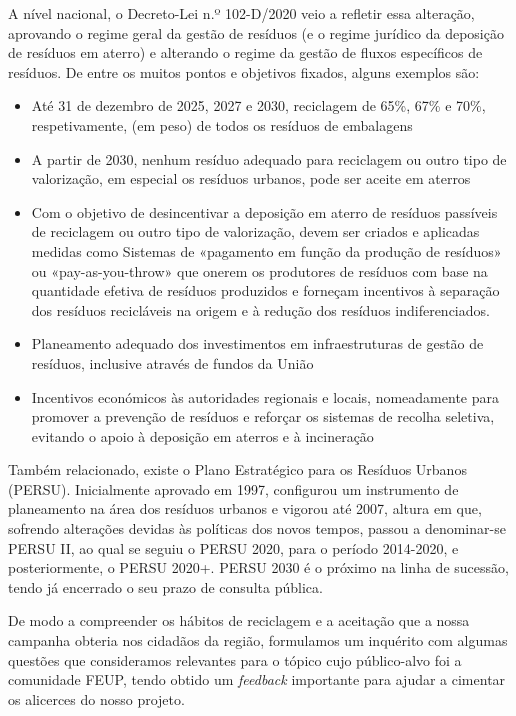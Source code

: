 \documentclass[11pt, a4paper, oneside]{book}
\begin{document}
A nível nacional, o Decreto-Lei n.º 102-D/2020 \cite{decreto-lei-102-d-2020} veio a refletir essa alteração, aprovando o regime geral da gestão de resíduos (e o regime jurídico da deposição de resíduos em aterro) e alterando o regime da gestão de fluxos específicos de resíduos. De entre os muitos pontos e objetivos fixados, alguns exemplos são:
\begin{itemize}
    \item Até 31 de dezembro de 2025, 2027 e 2030, reciclagem de 65\%, 67\% e 70\%, respetivamente, (em peso) de todos os resíduos de embalagens
    \item A partir de 2030, nenhum resíduo adequado para reciclagem ou outro tipo de valorização, em especial os resíduos urbanos, pode ser aceite em aterros
    \item Com o objetivo de desincentivar a deposição em aterro de resíduos passíveis de reciclagem ou outro tipo de valorização, devem ser criados e aplicadas medidas como Sistemas de «pagamento em função da produção de resíduos» ou «pay-as-you-throw» \cite{pay-as-you-throw} que onerem os produtores de resíduos com base na quantidade efetiva de resíduos produzidos e forneçam incentivos à separação dos resíduos recicláveis na origem e à redução dos resíduos indiferenciados.
    \item Planeamento adequado dos investimentos em infraestruturas de gestão de resíduos, inclusive através de fundos da União
    \item Incentivos económicos às autoridades regionais e locais, nomeadamente para promover a prevenção de resíduos e reforçar os sistemas de recolha seletiva, evitando o apoio à deposição em aterros e à incineração
\end{itemize}
Também relacionado, existe o Plano Estratégico para os Resíduos Urbanos (PERSU). Inicialmente aprovado em 1997, configurou um instrumento de planeamento na área dos resíduos urbanos e vigorou até 2007, altura em que, sofrendo alterações devidas às políticas dos novos tempos, passou a denominar-se PERSU II, ao qual se seguiu o PERSU 2020, para o período 2014-2020, e posteriormente, o PERSU 2020+. PERSU 2030 é o próximo na linha de sucessão, tendo já encerrado o seu prazo de consulta pública.

De modo a compreender os hábitos de reciclagem e a aceitação que a nossa campanha obteria nos cidadãos da região, formulamos um inquérito com algumas questões que consideramos relevantes para o tópico cujo público-alvo foi a comunidade FEUP, tendo obtido um \textit{feedback} importante para ajudar a cimentar os alicerces do nosso projeto.
\end{document}
